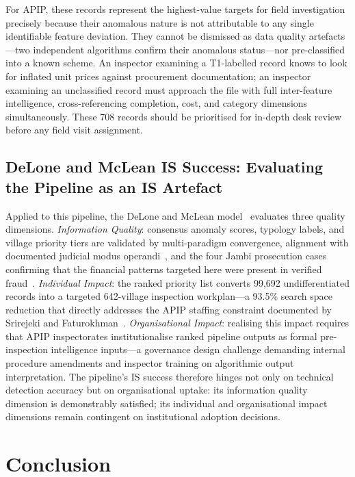 \documentclass[3p,times,procedia]{elsarticle}
\begin{document}
For APIP, these records represent the highest-value targets for field investigation precisely because their anomalous nature is not attributable to any single identifiable feature deviation. They cannot be dismissed as data quality artefacts---two independent algorithms confirm their anomalous status---nor pre-classified into a known scheme. An inspector examining a T1-labelled record knows to look for inflated unit prices against procurement documentation; an inspector examining an unclassified record must approach the file with full inter-feature intelligence, cross-referencing completion, cost, and category dimensions simultaneously. These 708 records should be prioritised for in-depth desk review before any field visit assignment.

\subsection{DeLone and McLean IS Success: Evaluating the Pipeline as an IS Artefact}

Applied to this pipeline, the DeLone and McLean model~\cite{ref10} evaluates three quality dimensions. \textit{Information Quality}: consensus anomaly scores, typology labels, and village priority tiers are validated by multi-paradigm convergence, alignment with documented judicial modus operandi~\cite{ref13,ref14}, and the four Jambi prosecution cases confirming that the financial patterns targeted here were present in verified fraud~\cite{ref30,ref31,ref32,ref33}. \textit{Individual Impact}: the ranked priority list converts 99,692 undifferentiated records into a targeted 642-village inspection workplan---a 93.5\% search space reduction that directly addresses the APIP staffing constraint documented by Srirejeki and Faturokhman~\cite{ref12}. \textit{Organisational Impact}: realising this impact requires that APIP inspectorates institutionalise ranked pipeline outputs as formal pre-inspection intelligence inputs---a governance design challenge demanding internal procedure amendments and inspector training on algorithmic output interpretation. The pipeline's IS success therefore hinges not only on technical detection accuracy but on organisational uptake: its information quality dimension is demonstrably satisfied; its individual and organisational impact dimensions remain contingent on institutional adoption decisions.

\section{Conclusion}
\label{sec:conclusion}
\end{document}
